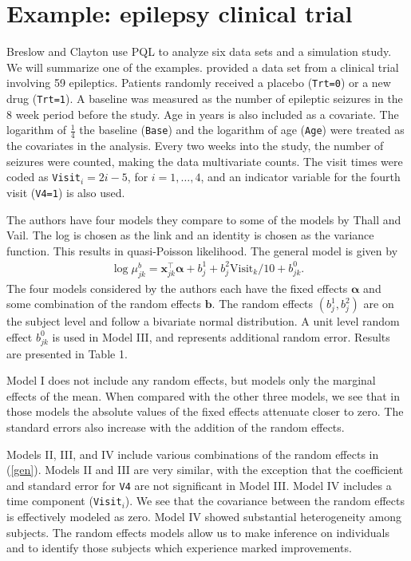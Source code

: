 \documentclass[12pt]{article}
\newcommand{\m}[1]{\mathbf{\bm{#1}}}
\begin{document}
\section{Example: epilepsy clinical trial}

Breslow and Clayton use PQL to analyze six data sets and a simulation study. We will summarize one of the examples. \cite{thall:1990} provided a data set from a clinical trial involving 59 epileptics. Patients randomly received a placebo (\texttt{Trt=0}) or a new drug (\texttt{Trt=1}). A baseline was measured as the number of epileptic seizures in the 8 week period before the study. Age in years is also included as a covariate. The logarithm of $\frac{1}{4}$ the baseline (\texttt{Base}) and the logarithm of age (\texttt{Age}) were treated as the covariates in the analysis. Every two weeks into the study, the number of seizures were counted, making the data multivariate counts. The visit times were coded as \texttt{Visit}$_i=2i-5$, for $i=1,\ldots,4$, and an indicator variable for the fourth visit (\texttt{V4=1}) is also used.

The authors have four models they compare to some of the models by Thall and Vail. The log is chosen as the link and an identity is chosen as the variance function. This results in quasi-Poisson likelihood. The general model is given by
\begin{eqnarray}
\log \mu_{jk}^b = \m{x}_{jk}^\top\m{\alpha}+b_j^1+b_j^2\mathrm{Visit}_k/10+b_{jk}^0. \label{gen}
\end{eqnarray}
The four models considered by the authors each have the fixed effects $\m{\alpha}$ and some combination of the random effects $\m{b}$. The random effects $(b_j^1, b_j^2)$ are on the subject level and follow a bivariate normal distribution. A unit level random effect $b_{jk}^0$ is used in Model III, and represents additional random error. Results are presented in Table 1.

Model I does not include any random effects, but models only the marginal effects of the mean. When compared with the other three models, we see that in those models the absolute values of the fixed effects attenuate closer to zero. The standard errors also increase with the addition of the random effects.

Models II, III, and IV include various combinations of the random effects in (\ref{gen}). Models II and III are very similar, with the exception that the coefficient and standard error for \texttt{V4} are not significant in Model III. Model IV includes a time component (\texttt{Visit}$_i$). We see that the covariance between the random effects is effectively modeled as zero. Model IV showed substantial heterogeneity among subjects. The random effects models allow us to make inference on individuals and to identify those subjects which experience marked improvements.
\end{document}
